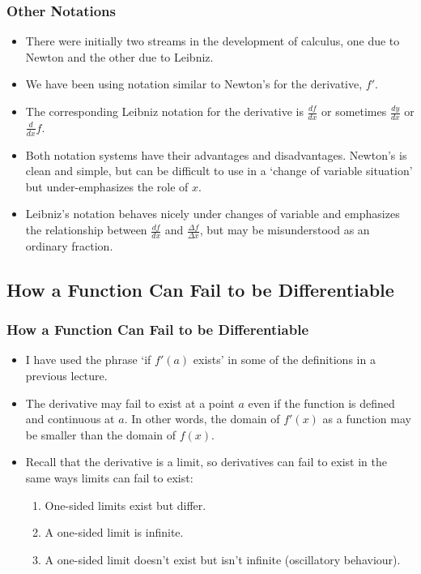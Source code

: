 \documentclass[serif,ignorenonframetext]{beamer}
\newcommand{\ds}{\displaystyle}
\begin{document}
\begin{frame}
  \frametitle{Other Notations}
  \begin{itemize}
  \item There were initially two streams in the development of calculus, one
    due to Newton and the other due to Leibniz.
  \pause
  \item We have been using notation similar to Newton's for the derivative,
    $f'$.
  \pause
  \item The corresponding Leibniz notation for the derivative is
    $\ds \frac{df}{dx}$ or sometimes $\ds \frac{dy}{dx}$ or $\ds\frac{d}{dx} f$.
  \pause
  \item Both notation systems have their advantages and disadvantages.
    Newton's is clean and simple, but can be difficult to use in a `change
    of variable situation' but under-emphasizes the role of $x$.  
  \pause
  \item Leibniz's notation behaves nicely under changes of variable 
    and emphasizes the relationship between $\ds\frac{df}{dx}$ and
    $\ds\frac{\Delta f}{\Delta x}$, but may be misunderstood as an
    ordinary fraction.
  \end{itemize}
\end{frame}


\subsection{How a Function Can Fail to be Differentiable}

\begin{frame}
  \frametitle{How a Function Can Fail to be Differentiable}
  \begin{itemize}
  \item I have used the phrase `if $f'(a)$ exists' in some of the definitions
    in a previous lecture.
  \pause
  \item The derivative may fail to exist at a point $a$ even if the function
    is defined and continuous at $a$.  In other words, the domain of $f'(x)$
    as a function may be smaller than the domain of $f(x)$.
  \pause
  \item Recall that the derivative is a limit, so derivatives can fail to
    exist in the same ways limits can fail to exist:
    \begin{enumerate}
    \pause
    \item One-sided limits exist but differ.
    \pause
    \item A one-sided limit is infinite.
    \pause
    \item A one-sided limit doesn't exist but isn't infinite (oscillatory
      behaviour).
    \end{enumerate}
  \end{itemize}
\end{frame}
\end{document}
